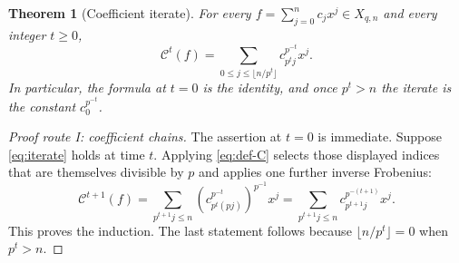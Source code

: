 \documentclass[10pt,a4paper]{amsart}
\newtheorem{theorem}{Theorem}[section]
\theoremstyle{definition}
\theoremstyle{remark}
\begin{document}
\begin{theorem}[Coefficient iterate]
\label{thm:iterate}
For every $f=\sum_{j=0}^{n}c_jx^j\in X_{q,n}$ and every integer $t\ge0$,
\begin{equation}
 \boxed{\quad
 \mathcal C^t(f)
   =\sum_{0\le j\le\lfloor n/p^t\rfloor}
      c_{p^tj}^{p^{-t}}x^j.
 \quad}
 \label{eq:iterate}
\end{equation}
In particular, the formula at $t=0$ is the identity, and once $p^t>n$ the
iterate is the constant $c_0^{p^{-t}}$.
\end{theorem}

\begin{proof}[Proof route I: coefficient chains]
The assertion at $t=0$ is immediate.  Suppose \eqref{eq:iterate} holds at
time $t$.  Applying \eqref{eq:def-C} selects those displayed indices that
are themselves divisible by $p$ and applies one further inverse Frobenius:
\[
 \mathcal C^{t+1}(f)
 =\sum_{p^{t+1}j\le n}
   \left(c_{p^t(pj)}^{p^{-t}}\right)^{p^{-1}}x^j
 =\sum_{p^{t+1}j\le n}c_{p^{t+1}j}^{p^{-(t+1)}}x^j.
\]
This proves the induction.  The last statement follows because
$\lfloor n/p^t\rfloor=0$ when $p^t>n$.
\end{proof}
\end{document}
